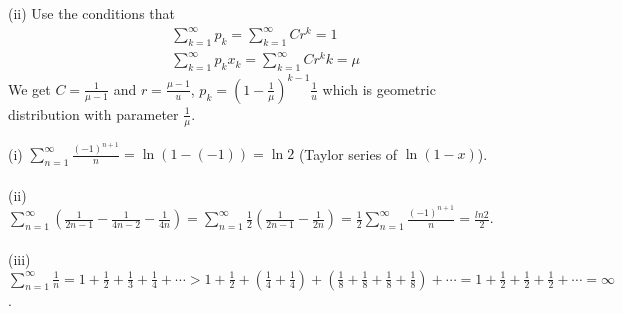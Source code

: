 \documentclass{homework}
\begin{document}
(ii) Use the conditions that
\begin{equation}
    \begin{aligned}
        &\sum_{k=1}^{\infty}p_{k}=\sum_{k=1}^{\infty}Cr^{k}=1 \\
        &\sum_{k=1}^{\infty}p_{k}x_{k}=\sum_{k=1}^{\infty}Cr^{k}k=\mu
    \end{aligned}
\end{equation}
We get $C=\frac{1}{\mu-1}$ and $r=\frac{\mu-1}{u}$, $p_{k}=(1-\frac{1}{\mu})^{k-1}\frac{1}{u}$ which is geometric distribution with parameter $\frac{1}{\mu}$.

\question %

(i) $\sum_{n=1}^{\infty}\frac{(-1)^{n+1}}{n} =\ln(1-(-1))=\ln 2$ (Taylor series of $\ln(1-x)$).\\
\\
(ii) $\sum_{n=1}^{\infty}(\frac{1}{2n-1}-\frac{1}{4n-2}-\frac{1}{4n})
=\sum_{n=1}^{\infty}\frac{1}{2}(\frac{1}{2n-1}-\frac{1}{2n})=\frac{1}{2}\sum_{n=1}^{\infty}\frac{(-1)^{n+1}}{n}=\frac{ln2}{2}$.\\
\\
(iii) $\sum_{n=1}^{\infty}\frac{1}{n}=1+\frac{1}{2}+\frac{1}{3}+\frac{1}{4}+ \cdots 
> 1+\frac{1}{2}+(\frac{1}{4}+\frac{1}{4})+(\frac{1}{8}+\frac{1}{8}+\frac{1}{8}+\frac{1}{8})+\cdots
=1+\frac{1}{2}+\frac{1}{2}+\frac{1}{2}+\cdots = \infty$.
\end{document}
